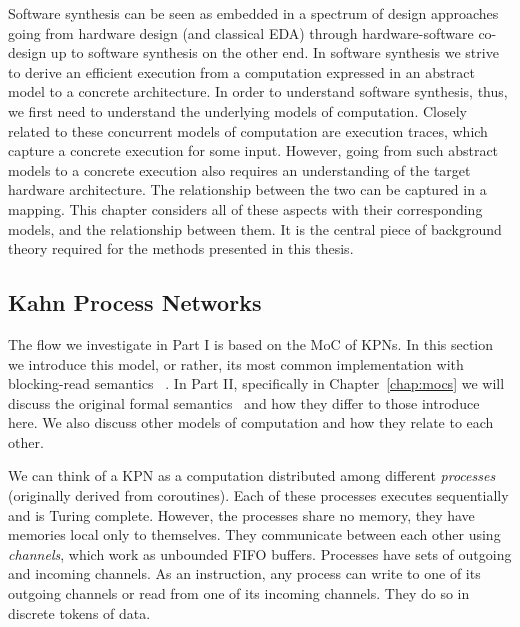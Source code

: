 Software synthesis can be seen as embedded in a spectrum of design approaches going from hardware design (and classical \ac{EDA}) through hardware-software co-design up to software synthesis on the other end. 
In software synthesis we strive to derive an efficient execution from a computation expressed in an abstract model to a concrete architecture.
In order to understand software synthesis, thus, we first need to understand the underlying models of computation.
Closely related to these concurrent models of computation are execution traces, which capture a concrete execution for some input.
However, going from such abstract models to a concrete execution also requires an understanding of the target hardware architecture.
The relationship between the two can be captured in a mapping.
This chapter considers all of these aspects with their corresponding models, and the relationship between them.
It is the central piece of background theory required for the methods presented in this thesis.

\subsection{Kahn Process Networks}
\label{sec:kpn_basic}

The flow we investigate in Part I is based on the \ac{MoC} of \acfp{KPN}.
In this section we introduce this model, or rather, its most common implementation with blocking-read semantics~\cite{kahn_macqueen} .
In Part II, specifically in Chapter~\ref{chap:mocs} we will discuss the original formal semantics~\cite{kahn74} and how they differ to those introduce here.
We also discuss other models of computation and how they relate to each other.

We can think of a \ac{KPN} as a computation distributed among different \emph{processes} (originally derived from coroutines).
Each of these processes executes sequentially and is Turing complete. However, the processes share no memory, they have memories local only to themselves.
They communicate between each other using \emph{channels}, which work as unbounded \acs{FIFO} buffers. 
Processes have sets of outgoing and incoming channels.
As an instruction, any process can write to one of its outgoing channels or read from one of its incoming channels.
They do so in discrete tokens of data.

